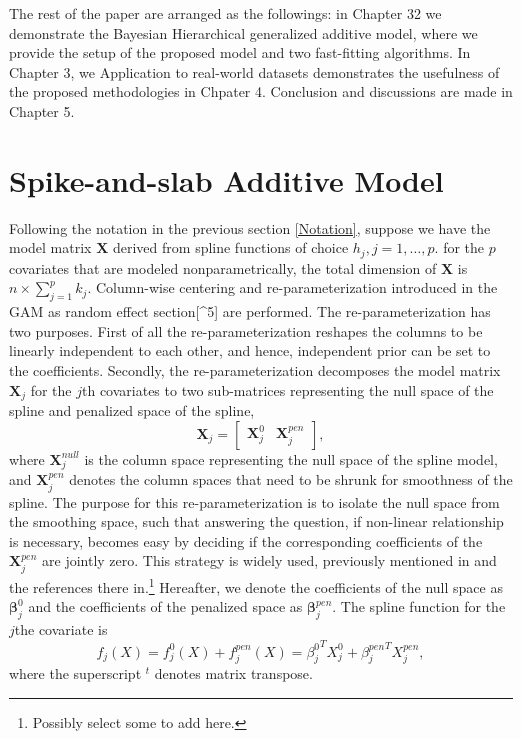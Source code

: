 \documentclass[AMA,STIX1COL,]{WileyNJD-v2}
\begin{document}
The rest of the paper are arranged as the followings: in Chapter 32 we
demonstrate the Bayesian Hierarchical generalized additive model, where
we provide the setup of the proposed model and two fast-fitting
algorithms. In Chapter 3, we Application to real-world datasets
demonstrates the usefulness of the proposed methodologies in Chpater 4.
Conclusion and discussions are made in Chapter 5.

\hypertarget{spike-and-slab-additive-model}{%
\section{Spike-and-slab Additive
Model}\label{spike-and-slab-additive-model}}

Following the notation in the previous section \ref{Notation}, suppose
we have the model matrix \(\boldsymbol{X}\) derived from spline
functions of choice \(h_j, j = 1, \dots, p.\) for the \(p\) covariates
that are modeled nonparametrically, the total dimension of
\(\boldsymbol{X}\) is \(n \times \sum\limits_{j=1}^p k_j\). Column-wise
centering and re-parameterization introduced in the GAM as random effect
section{[}\^{}5{]} are performed. The re-parameterization has two
purposes. First of all the re-parameterization reshapes the columns to
be linearly independent to each other, and hence, independent prior can
be set to the coefficients. Secondly, the re-parameterization decomposes
the model matrix \(\boldsymbol{X}_j\) for the \(j\)th covariates to two
sub-matrices representing the null space of the spline and penalized
space of the spline, \[
\boldsymbol{X}_j = \begin{bmatrix}
\boldsymbol{X}_j^{0} & \boldsymbol{X}_j^{pen}
\end{bmatrix},
\] where \(\boldsymbol{X}_j^{null}\) is the column space representing
the null space of the spline model, and \(\boldsymbol{X}_j^{pen}\)
denotes the column spaces that need to be shrunk for smoothness of the
spline. The purpose for this re-parameterization is to isolate the null
space from the smoothing space, such that answering the question, if
non-linear relationship is necessary, becomes easy by deciding if the
corresponding coefficients of the \(\boldsymbol{X}_j^{pen}\) are jointly
zero. This strategy is widely used, previously mentioned in
\citet{Scheipl2012} and the references there in.\footnote{Possibly
  select some to add here.} Hereafter, we denote the coefficients of the
null space as \(\boldsymbol{\beta}^{0}_j\) and the coefficients of the
penalized space as \(\boldsymbol{\beta}^{pen}_j\). The spline function
for the \(j\)the covariate is \[
f_j(X) = f_j^0(X) + f_j^{pen}(X) = {\beta_j^0}^T X_j^0 + {\beta_j^{pen}}^T X_j^{pen},
\] where the superscript \(^t\) denotes matrix transpose.
\end{document}
